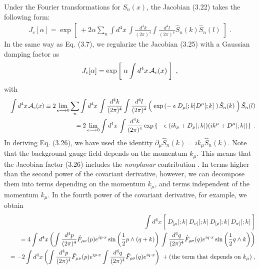 \documentclass[a4paper,12pt]{article}
\begin{document}
Under the Fourier transformations for $S_{n}(x)$, the Jacobian (3.22) takes 
the following form: 
%
%
\begin{eqnarray}
J_{c}[\alpha] = \exp \left[\; 
+2\alpha \sum_{n} \int d^{4}x \, 
\int\frac{d^{4}k}{(2\pi)^{4}} \int\frac{d^{4}l}{(2\pi)^{4}}
\hat{S}_{n}(k)  \hat{S}_{n}(l)  \; \right]  \;.
\end{eqnarray}
%
In the same way as Eq. (3.7), we regularize the Jacobian 
(3.25) with a Gaussian damping factor as 
%
%
\begin{eqnarray}
J_{c}[\alpha] = \exp \left[\; 
\alpha \int d^{4}x \, {\cal A}_{c}(x) \; \right] \;, \nonumber 
\end{eqnarray}
%
%
with 
%
%
\begin{eqnarray}
& & \int d^{4}x \,{\cal A}_{c}(x) \equiv 2\lim_{\epsilon \longrightarrow 0}
\sum_{n} \int d^{4}x \, 
\int\frac{d^{4}k}{(2\pi)^{4}} \int\frac{d^{4}l}{(2\pi)^{4}}
\left(\; \exp\left(-\; \epsilon\; D_{\mu}[;k] D^{\mu}[;k] \;\right)
\hat{S}_{n}(k) \; \right) \hat{S}_{n}(l)  \nonumber \\ 
& & = 2\lim_{\epsilon \longrightarrow 0} \int d^{4}x \, 
\int\frac{d^{4}k}{(2\pi)^{4}} 
\exp\left\{-\; \epsilon\; (ik_{\mu}+D_{\mu}[;k]) 
(ik^{\mu}+D^{\mu}[;k]) \right\} \;.
\end{eqnarray}
%
In deriving Eq. (3.26), we have used the identity $\partial_{\mu}
\hat{S}_{n}(k) = ik_{\mu}\hat{S}_{n}(k)$. Note that the 
background gauge field depends on the momentum $k_{\mu}$. This means that the 
Jacobian factor (3.26) includes the {\it nonplanar} contribution 
\cite{VVKGT, SMMVR}.
In terms higher than the second power of the covariant derivative, 
however, we can decompose them into terms depending on the momentum 
$k_{\mu}$, and terms independent of the momentum $k_{\mu}$. 
In the fourth power of the covariant derivative, for example, we obtain  
%
\begin{eqnarray}
& & \int d^{4}x \, \biggl[\; 
D_{[\mu}[;k] \; D_{\nu]}[;k] \; 
D_{[\rho}[;k] \; D_{\sigma]}[;k] \; \biggr] \\
& & = 4 \int d^{4}x \, \biggl( 
\int \frac{d^{4}p}{(2\pi)^{4}} \hat{F}_{\mu\nu}(p)e^{ip \cdot x} 
\sin \left( \frac{1}{2}p \wedge (q+k) \right) \, 
\int \frac{d^{4}q}{(2\pi)^{4}} \hat{F}_{\rho\sigma}(q)e^{iq \cdot x} 
\sin \left( \frac{1}{2}q \wedge k \right) 
\biggr)  \nonumber \\
& & = -2\int d^{4}x \, \biggl( 
\int \frac{d^{4}p}{(2\pi)^{4}} \hat{F}_{\mu\nu}(p)e^{ip \cdot x} 
\int \frac{d^{4}q}{(2\pi)^{4}} \hat{F}_{\rho\sigma}(q)e^{iq \cdot x} 
\biggr) \; + (\mbox{\rm the term that depends on $k_{\mu}$}) 
\nonumber \;,
\end{eqnarray}
\end{document}
